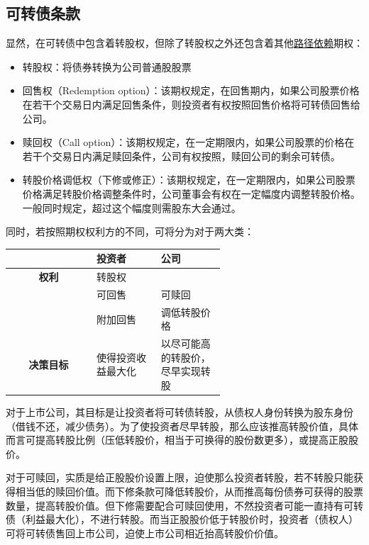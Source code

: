 \documentclass[11pt]{article}
\begin{document}
\subsection{可转债条款}

显然，在可转债中包含着转股权，但除了转股权之外还包含着其他\uline{路径依赖}期权：
\begin{itemize}
    \item 转股权：将债券转换为公司普通股股票
    \item 回售权（Redemption option）：该期权规定，在回售期内，如果公司股票价格在若干个交易日内满足回售条件，则投资者有权按照回售价格将可转债回售给公司。
    \item 赎回权（Call option）：该期权规定，在一定期限内，如果公司股票的价格在若干个交易日内满足赎回条件，公司有权按照，赎回公司的剩余可转债。
    \item 转股价格调低权（下修或修正）：该期权规定，在一定期限内，如果公司股票价格满足转股价格调整条件时，公司董事会有权在一定幅度内调整转股价格。一般同时规定，超过这个幅度则需股东大会通过。
\end{itemize}

同时，若按照期权权利方的不同，可将分为对于两大类：
\begin{table}[H]
\centering
\begin{tabular}{c p{0.3\linewidth} p{0.3\linewidth}}
\toprule
\textbf{} & \textbf{投资者} & \textbf{公司} \\ \midrule
\textbf{权利} & 转股权 &  \\
\textbf{} & 可回售 & 可赎回 \\
\textbf{} & 附加回售 & 调低转股价格 \\
\textbf{决策目标} & 使得投资收益最大化 & 以尽可能高的转股价，尽早实现转股 \\ \bottomrule
\end{tabular}
\end{table}

对于上市公司，其目标是让投资者将可转债转股，从债权人身份转换为股东身份（借钱不还，减少债务）。为了使投资者尽早转股，那么应该推高转股价值，具体而言可提高转股比例（压低转股价，相当于可换得的股份数更多），或提高正股股价。

对于可赎回，实质是给正股股价设置上限，迫使那么投资者转股，若不转股只能获得相当低的赎回价值。而下修条款可降低转股价，从而推高每份债券可获得的股票数量，提高转股价值。但下修需要配合可赎回使用，不然投资者可能一直持有可转债（利益最大化），不进行转股。而当正股股价低于转股价时，投资者（债权人）可将可转债售回上市公司，迫使上市公司相近抬高转股价价值。
\end{document}
